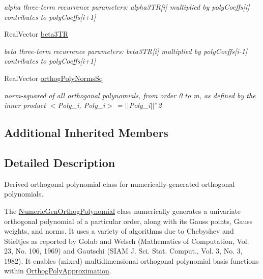\begin{DoxyCompactItemize}
\begin{DoxyCompactList}\small\item\em alpha three-\/term recurrence parameters\+: alpha3\+TR\mbox{[}i\mbox{]} multiplied by poly\+Coeffs\mbox{[}i\mbox{]} contributes to poly\+Coeffs\mbox{[}i+1\mbox{]} \end{DoxyCompactList}\item 
Real\+Vector \hyperlink{classPecos_1_1NumericGenOrthogPolynomial_a8146884bd7a086c78eae2aa329e22b5e}{beta3\+TR}\label{classPecos_1_1NumericGenOrthogPolynomial_a8146884bd7a086c78eae2aa329e22b5e}

\begin{DoxyCompactList}\small\item\em beta three-\/term recurrence parameters\+: beta3\+TR\mbox{[}i\mbox{]} multiplied by poly\+Coeffs\mbox{[}i-\/1\mbox{]} contributes to poly\+Coeffs\mbox{[}i+1\mbox{]} \end{DoxyCompactList}\item 
Real\+Vector \hyperlink{classPecos_1_1NumericGenOrthogPolynomial_af1ac0a4c6b21213db496fb5ae70df0ea}{orthog\+Poly\+Norms\+Sq}\label{classPecos_1_1NumericGenOrthogPolynomial_af1ac0a4c6b21213db496fb5ae70df0ea}

\begin{DoxyCompactList}\small\item\em norm-\/squared of all orthogonal polynomials, from order 0 to m, as defined by the inner product $<$Poly\+\_\+i, Poly\+\_\+i$>$ = $\vert$$\vert$\+Poly\+\_\+i$\vert$$\vert$$^\wedge$2 \end{DoxyCompactList}\end{DoxyCompactItemize}
\subsection*{Additional Inherited Members}


\subsection{Detailed Description}
Derived orthogonal polynomial class for numerically-\/generated orthogonal polynomials. 

The \hyperlink{classPecos_1_1NumericGenOrthogPolynomial}{Numeric\+Gen\+Orthog\+Polynomial} class numerically generates a univariate orthogonal polynomial of a particular order, along with its Gauss points, Gauss weights, and norms. It uses a variety of algorithms due to Chebyshev and Stieltjes as reported by Golub and Welsch (Mathematics of Computation, Vol. 23, No. 106, 1969) and Gautschi (S\+I\+AM J. Sci. Stat. Comput., Vol. 3, No. 3, 1982). It enables (mixed) multidimensional orthogonal polynomial basis functions within \hyperlink{classPecos_1_1OrthogPolyApproximation}{Orthog\+Poly\+Approximation}. 

